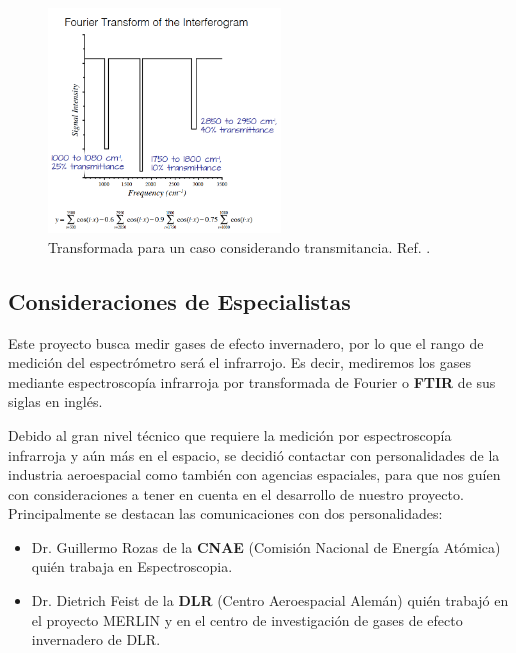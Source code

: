 \documentclass[11pt,titlepage]{article}
\begin{document}
    \begin{figure}[ht!]
    \centering
    \includegraphics[width=0.55\textwidth]{fig/FTS-SIM3.png}
    \caption{Transformada para un caso considerando transmitancia. Ref. \cite{FTS}.}
    \label{fig:FTS-SIM3}
\end{figure}



\subsection{Consideraciones de Especialistas}

Este proyecto busca medir gases de efecto invernadero, por lo que el rango de medición del espectrómetro será el infrarrojo. Es decir, mediremos los gases mediante espectroscopía infrarroja por transformada de Fourier o \textbf{FTIR} de sus siglas en inglés.\par

Debido al gran nivel técnico que requiere la medición por espectroscopía infrarroja y aún más en el espacio, se decidió contactar con personalidades de la industria aeroespacial como también con agencias espaciales, para que nos guíen con consideraciones a tener en cuenta en el desarrollo de nuestro proyecto. Principalmente se destacan las comunicaciones con dos personalidades:
\begin{itemize}
    \item Dr. Guillermo Rozas de la \textbf{CNAE} (Comisión Nacional de Energía Atómica) quién trabaja en Espectroscopia.
    \item Dr. Dietrich Feist de la \textbf{DLR} (Centro Aeroespacial Alemán) quién trabajó en el proyecto MERLIN y en el centro de investigación de gases de efecto invernadero de DLR.
\end{itemize}
\par
\end{document}
